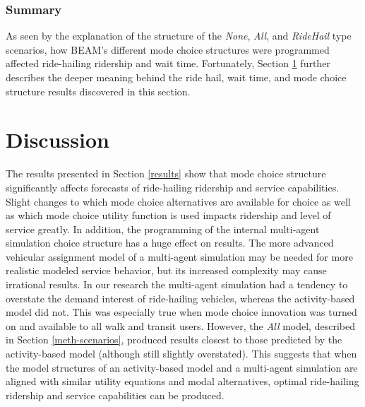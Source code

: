 \documentclass[fancy, masters]{byuthesis}
\begin{document}
\hypertarget{summary-1}{%
\subsection{Summary}\label{summary-1}}

As seen by the explanation of the structure of the \emph{None}, \emph{All}, and \emph{RideHail} type scenarios, how BEAM's different mode choice structures were programmed affected ride-hailing ridership and wait time. Fortunately, Section \ref{discussion} further describes the deeper meaning behind the ride hail, wait time, and mode choice structure results discovered in this section.

\hypertarget{discussion}{%
\chapter{Discussion}\label{discussion}}

The results presented in Section \ref{results} show that mode choice structure significantly affects forecasts of ride-hailing ridership and service capabilities. Slight changes to which mode choice alternatives are available for choice as well as which mode choice utility function is used impacts ridership and level of service greatly. In addition, the programming of the internal multi-agent simulation choice structure has a huge effect on results. The more advanced vehicular assignment model of a multi-agent simulation may be needed for more realistic modeled service behavior, but its increased complexity may cause irrational results. In our research the multi-agent simulation had a tendency to overstate the demand interest of ride-hailing vehicles, whereas the activity-based model did not. This was especially true when mode choice innovation was turned on and available to all walk and transit users. However, the \emph{All} model, described in Section \ref{meth-scenarios}, produced results closest to those predicted by the activity-based model (although still slightly overstated). This suggests that when the model structures of an activity-based model and a multi-agent simulation are aligned with similar utility equations and modal alternatives, optimal ride-hailing ridership and service capabilities can be produced.
\end{document}
